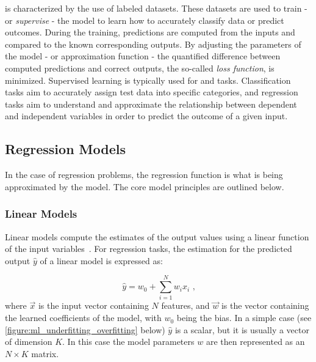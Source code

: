  is characterized by the use of labeled datasets.
These datasets are used to train - or \textit{supervise} - the model to learn how to accurately classify data or predict outcomes.
During the training, predictions are computed from the inputs and compared to the known corresponding outputs.
By adjusting the parameters of the model - or approximation function - the quantified difference between computed predictions and correct outputs, the so-called \textit{loss function}, is minimized.
Supervised learning is typically used for  and  tasks.
Classification tasks aim to accurately assign test data into specific categories, and regression tasks aim to understand and approximate the relationship between dependent and independent variables in order to predict the outcome of a given input.

\subsection{Regression Models}

In the case of regression problems, the regression function is what is being approximated by the model.
The core model principles are outlined below.

\subsubsection*{Linear Models}

Linear models compute the estimates of the output values using a linear function of the input variables~\cite{PNAS:Lai:Strong_Consistency_Least_Squares_Estimates_Regression_Models}.
For regression tasks, the estimation for the predicted output \(\hat{y}\) of a linear model is expressed as:

\begin{equation}
    \hat{y} = w_0 + \sum_{i=1}^{N} w_i x_i \text{ ,}
    \label{equation:linear_regression_prediction}
\end{equation}
where \(\vec{x}\) is the input vector containing \(N\) features, and \(\vec{w}\) is the vector containing the learned coefficients of the model, with \(w_0\) being the bias.
In a simple case (see \cref{figure:ml_underfitting_overfitting} below) \(\hat{y}\) is a scalar, but it is usually a vector of dimension \(K\).
In this case the model parameters \(w\) are then represented as an \(N \times K\) matrix.


